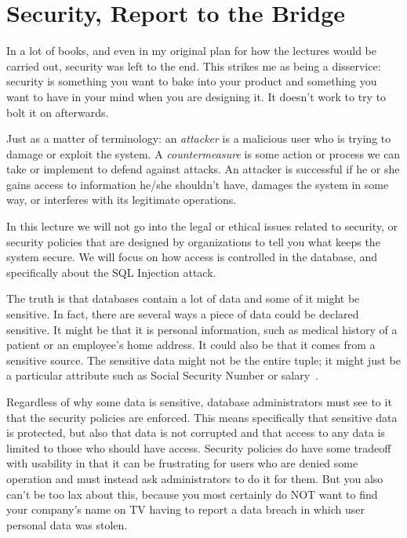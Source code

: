 




\section*{Security, Report to the Bridge}

In a lot of books, and even in my original plan for how the lectures would be carried out, security was left to the end. This strikes me as being a disservice: security is something you want to bake into your product and something you want to have in your mind when you are designing it. It doesn't work to try to bolt it on afterwards. 

Just as a matter of terminology: an \textit{attacker} is a malicious user who is trying to damage or exploit the system. A \textit{countermeasure} is some action or process we can take or implement to defend against attacks. An attacker is successful if he or she gains access to information he/she shouldn't have, damages the system in some way, or interferes with its legitimate operations.

In this lecture we will not go into the legal or ethical issues related to security, or security policies that are designed by organizations to tell you what keeps the system secure. We will focus on how access is controlled in the database, and specifically about the SQL Injection attack. 

The truth is that databases contain a lot of data and some of it might be sensitive. In fact, there are several ways a piece of data could be declared sensitive. It might be that it is personal information, such as medical history of a patient or an employee's home address. It could also be that it comes from a sensitive source. The sensitive data might not be the entire tuple; it might just be a particular attribute  such as Social Security Number or salary~\cite{fds}. 

Regardless of why some data is sensitive, database administrators must see to it that the security policies are enforced. This means specifically that sensitive data is protected, but also that data is not corrupted and that access to any data is limited to those who should have access. Security policies do have some tradeoff with usability in that it can be frustrating for users who are denied some operation and must instead ask administrators to do it for them. But you also can't be too lax about this, because you most certainly do NOT want to find your company's name on TV having to report a data breach in which user personal data was stolen.


